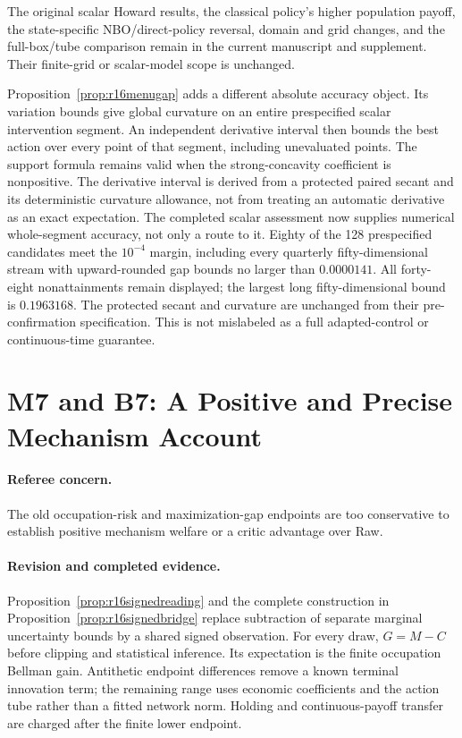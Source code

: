 The original scalar Howard results, the classical policy's higher population payoff, the state-specific NBO/direct-policy reversal, domain and grid changes, and the full-box/tube comparison remain in the current manuscript and supplement. Their finite-grid or scalar-model scope is unchanged.

Proposition~\ref{prop:r16menugap} adds a different absolute accuracy object. Its variation bounds give global curvature on an entire prespecified scalar intervention segment. An independent derivative interval then bounds the best action over every point of that segment, including unevaluated points. The support formula remains valid when the strong-concavity coefficient is nonpositive. The derivative interval is derived from a protected paired secant and its deterministic curvature allowance, not from treating an automatic derivative as an exact expectation. The completed scalar assessment now supplies numerical whole-segment accuracy, not only a route to it. Eighty of the 128 prespecified candidates meet the $10^{-4}$ margin, including every quarterly fifty-dimensional stream with upward-rounded gap bounds no larger than $0.0000141$. All forty-eight nonattainments remain displayed; the largest long fifty-dimensional bound is $0.1963168$. The protected secant and curvature are unchanged from their pre-confirmation specification. This is not mislabeled as a full adapted-control or continuous-time guarantee.

\section{M7 and B7: A Positive and Precise Mechanism Account}
\paragraph*{Referee concern.} The old occupation-risk and maximization-gap endpoints are too conservative to establish positive mechanism welfare or a critic advantage over Raw.

\paragraph*{Revision and completed evidence.} Proposition~\ref{prop:r16signedreading} and the complete construction in Proposition~\ref{prop:r16signedbridge} replace subtraction of separate marginal uncertainty bounds by a shared signed observation. For every draw, $G=M-C$ before clipping and statistical inference. Its expectation is the finite occupation Bellman gain. Antithetic endpoint differences remove a known terminal innovation term; the remaining range uses economic coefficients and the action tube rather than a fitted network norm. Holding and continuous-payoff transfer are charged after the finite lower endpoint.

